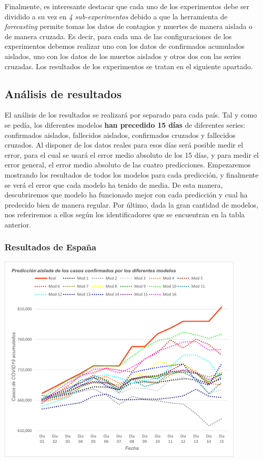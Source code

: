 \documentclass[12pt,a4paper, xcolor=table]{article}
\begin{document}
    
        Finalmente, es interesante destacar que cada uno de los experimentos debe ser dividido a su vez en \textit{4 sub-experimentos} debido a que la herramienta de \textit{forecasting} permite tomas los datos de contagios y muertes de manera aislada o de manera cruzada. Es decir, para cada una de las configuraciones de los experimentos debemos realizar uno con los datos de confirmados acumulados aislados, uno con los datos de los muertos aislados y otros dos con las series cruzadas. Los resultados de los experimentos se tratan en el siguiente apartado.
    
        \subsection{Análisis de resultados}
            El análisis de los resultados se realizará por separado para cada país. Tal y como se pedía, los diferentes modelos \textbf{han precedido 15 días} de diferentes series: confirmados aislados, fallecidos aislados, confirmados cruzados y fallecidos cruzados. Al disponer de los datos reales para esos días será posible medir el error, para el cual se usará el error medio absoluto de los 15 días, y para medir el error general, el error medio absoluto de las cuatro predicciones. Empezaremos mostrando los resultados de todos los modelos para cada predicción, y finalmente se verá el error que cada modelo ha tenido de media. De esta manera, descubriremos que modelo ha funcionado mejor con cada predicción y cual ha predecido bien de manera regular. Por último, dada la gran cantidad de modelos, nos referiremos a ellos según los identificadores que se encuentran en la tabla anterior.
            
            \subsubsection{Resultados de España}
            
            \begin{center}
                \centering
                \includegraphics[width=450px]{img/pred_a_conf_ES.png}
            \end{center}
            
\end{document}

